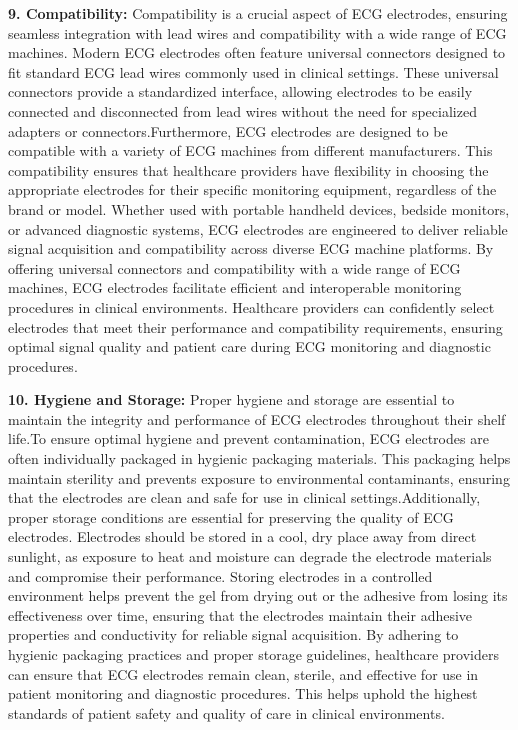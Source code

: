 \textbf{9. Compatibility:}
         Compatibility is a crucial aspect of ECG electrodes, ensuring seamless integration with lead wires and compatibility with a wide range of ECG machines. Modern ECG electrodes often feature universal connectors designed to fit standard ECG lead wires commonly used in clinical settings. These universal connectors provide a standardized interface, allowing electrodes to be easily connected and disconnected from lead wires without the need for specialized adapters or connectors.Furthermore, ECG electrodes are designed to be compatible with a variety of ECG machines from different manufacturers. This compatibility ensures that healthcare providers have flexibility in choosing the appropriate electrodes for their specific monitoring equipment, regardless of the brand or model. Whether used with portable handheld devices, bedside monitors, or advanced diagnostic systems, ECG electrodes are engineered to deliver reliable signal acquisition and compatibility across diverse ECG machine platforms.
        By offering universal connectors and compatibility with a wide range of ECG machines, ECG electrodes facilitate efficient and interoperable monitoring procedures in clinical environments. Healthcare providers can confidently select electrodes that meet their performance and compatibility requirements, ensuring optimal signal quality and patient care during ECG monitoring and diagnostic procedures.

\textbf{10. Hygiene and Storage:}
         Proper hygiene and storage are essential to maintain the integrity and performance of ECG electrodes throughout their shelf life.To ensure optimal hygiene and prevent contamination, ECG electrodes are often individually packaged in hygienic packaging materials. This packaging helps maintain sterility and prevents exposure to environmental contaminants, ensuring that the electrodes are clean and safe for use in clinical settings.Additionally, proper storage conditions are essential for preserving the quality of ECG electrodes. Electrodes should be stored in a cool, dry place away from direct sunlight, as exposure to heat and moisture can degrade the electrode materials and compromise their performance. Storing electrodes in a controlled environment helps prevent the gel from drying out or the adhesive from losing its effectiveness over time, ensuring that the electrodes maintain their adhesive properties and conductivity for reliable signal acquisition.
         By adhering to hygienic packaging practices and proper storage guidelines, healthcare providers can ensure that ECG electrodes remain clean, sterile, and effective for use in patient monitoring and diagnostic procedures. This helps uphold the highest standards of patient safety and quality of care in clinical environments.

